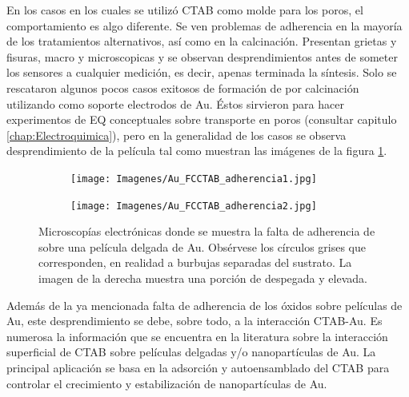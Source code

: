 			En los casos en los cuales se utilizó CTAB como molde para los poros, el comportamiento es algo diferente. Se ven problemas de adherencia en la mayoría de los tratamientos alternativos, así como en la calcinación. Presentan grietas y fisuras, macro y microscopicas y se observan desprendimientos antes de someter los sensores a cualquier medición, es decir, apenas terminada la síntesis. Solo se rescataron algunos pocos casos exitosos de formación de \pdmC\space por calcinación utilizando como soporte electrodos de Au. Éstos sirvieron para hacer experimentos de EQ conceptuales sobre transporte en poros (consultar capitulo \ref{chap:Electroquimica}), pero en la generalidad de los casos se observa desprendimiento de la película tal como muestran las imágenes de la figura \ref{fig:CTAB_adherencia}.
	     
				\begin{figure}[th]
		 	   	    \begin{subfigure}[t]{0.49\textwidth}
			        	\texttt{[image: Imagenes/Au\_FCCTAB\_adherencia1.jpg]}
			       		\end{subfigure}
					\begin{subfigure}[t]{0.49\textwidth}
			 	   	    \texttt{[image: Imagenes/Au\_FCCTAB\_adherencia2.jpg]}
			       		\end{subfigure}
					 \caption[Adherencia de CTAB sobre electrodos.]{Microscopías electrónicas donde se muestra la falta de adherencia de \pdmC\space sobre una película delgada de Au. Obsérvese los círculos grises que corresponden, en realidad a burbujas separadas del sustrato. La imagen de la derecha muestra una porción de \pdmC\space despegada y elevada.}
					 \label{fig:CTAB_adherencia}	
				     \end{figure}
			
			Además de la ya mencionada falta de adherencia de los óxidos sobre películas de Au, este desprendimiento se debe, sobre todo, a la interacción CTAB-Au. Es numerosa la información que se encuentra en la literatura sobre la interacción superficial de CTAB sobre películas delgadas y/o nanopartículas de Au. La principal aplicación se basa en la adsorción y autoensamblado del CTAB para controlar el crecimiento y estabilización de nanopartículas de Au. \cite{Cheng2003,Smith2008,Lim2014,Meena2013,Wang2013,Hamon2009}

